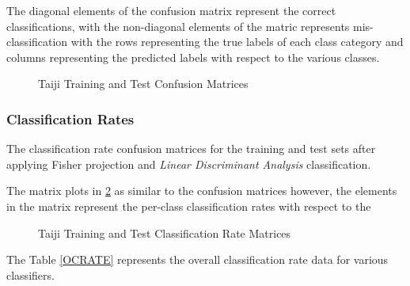 \documentclass[12pt,twoside,a4paper]{article}
\begin{document}
The diagonal elements of the confusion matrix represent the correct classifications, with the non-diagonal elements of the matric represents mis-classification with the rows representing the true labels of each class category and columns representing the predicted labels with respect to the various classes.
\begin{figure}[H]
    \centering
    \hspace{0mm}
    \hspace{0mm}
    \caption{Taiji Training and Test Confusion Matrices}
    \label{TAIJICR}
\end{figure}
\pagebreak
\subsubsection{Classification Rates}
The classification rate confusion matrices for the training and test sets after applying Fisher projection and \textit{Linear Discriminant Analysis} classification.

The matrix plots in \ref{TAIJICLR} as similar to the confusion matrices however, the elements in the matrix represent the per-class classification rates with respect to the 
\begin{figure}[H]
    \centering
    \hspace{0mm}
    \hspace{0mm}
    \caption{Taiji Training and Test Classification Rate Matrices}
    \label{TAIJICLR}
\end{figure}

The Table \ref{OCRATE} represents the overall classification rate data for various classifiers.
\end{document}

